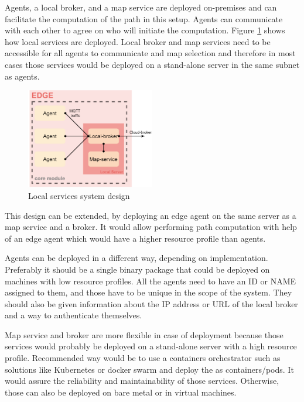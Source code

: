Agents, a local broker, and a map service are deployed on-premises and can facilitate the computation of the path in this setup. Agents can communicate with each other to agree on who will initiate the computation. Figure \ref{fig:local_services} shows how local services are deployed. Local broker and map services need to be accessible for all agents to communicate and map selection and therefore in most cases those services would be deployed on a stand-alone server in the same subnet as agents.

\begin{figure}[H]
    \centering
    \includegraphics[width=0.5\textwidth]{pictures/local_service.png}
    \caption{Local services system design}
    \label{fig:local_services}
\end{figure}

This design can be extended, by deploying an edge agent on the same server as a map service and a broker. It would allow performing path computation with help of an edge agent which would have a higher resource profile than agents.

Agents can be deployed in a different way, depending on implementation. Preferably it should be a single binary package that could be deployed on machines with low resource profiles. All the agents need to have an ID or NAME assigned to them, and those have to be unique in the scope of the system. They should also be given information about the IP address or URL of the local broker and a way to authenticate themselves. 

Map service and broker are more flexible in case of deployment because those services would probably be deployed on a stand-alone server with a high resource profile. Recommended way would be to use a containers orchestrator such as solutions like Kubernetes or docker swarm and deploy the as containers/pods. It would assure the reliability and maintainability of those services. Otherwise, those can also be deployed on bare metal or in virtual machines.